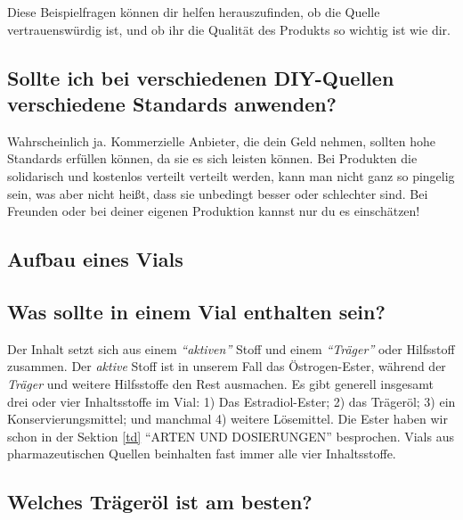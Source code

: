 \documentclass{article}
\begin{document}
Diese Beispielfragen können dir helfen herauszufinden, ob die Quelle vertrauenswürdig ist, und ob ihr die Qualität des Produkts so wichtig ist wie dir.

\subsection{Sollte ich bei verschiedenen DIY-Quellen verschiedene Standards anwenden?}

Wahrscheinlich ja. Kommerzielle Anbieter, die dein Geld nehmen, sollten hohe Standards erfüllen können, da sie es sich leisten können. Bei Produkten die solidarisch und kostenlos verteilt verteilt werden, kann man nicht ganz so pingelig sein, was aber nicht heißt, dass sie unbedingt besser oder schlechter sind. Bei Freunden oder bei deiner eigenen Produktion kannst nur du es einschätzen!

\subsection*{Aufbau eines Vials}

\subsection{Was sollte in einem Vial enthalten sein?}

Der Inhalt setzt sich aus einem \textit{“aktiven”} Stoff und einem \textit{“Träger”} oder Hilfsstoff zusammen. Der \textit{aktive} Stoff ist in unserem Fall das Östrogen-Ester, während der \textit{Träger} und weitere Hilfsstoffe den Rest ausmachen. Es gibt generell insgesamt drei oder vier Inhaltsstoffe im Vial: 1) Das Estradiol-Ester; 2) das Trägeröl; 3) ein Konservierungsmittel; und manchmal 4) weitere Lösemittel. Die Ester haben wir schon in der Sektion \ref{td} “ARTEN UND DOSIERUNGEN” besprochen. Vials aus pharmazeutischen Quellen beinhalten fast immer alle vier Inhaltsstoffe.

\subsection{Welches Trägeröl ist am besten?}\label{6-16}
\end{document}
